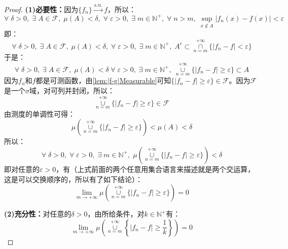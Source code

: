 \begin{proof}
	\textbf{(1)必要性：}因为$\{f_n\}\overset{\text{a.u.}}{\longrightarrow}f$，所以：
	\begin{equation*}
		\forall\;\delta>0,\;\exists\;A\in \mathscr{F},\;\mu(A)<\delta,\;\forall\;\varepsilon>0,\;\exists\;m\in \mathbb{N}^+,\;\forall\;n>m,\;\sup_{x\notin A}|f_n(x)-f(x)|<\varepsilon
	\end{equation*}
	即：
	\begin{equation*}
		\forall\;\delta>0,\;\exists\;A\in \mathscr{F},\;\mu(A)<\delta,\;\forall\;\varepsilon>0,\;\exists\;m\in\mathbb{N}^+,\;A^c\subset\underset{n=m}{\overset{+\infty}{\cap}}\{|f_n-f|<\varepsilon\}
	\end{equation*}
	于是：
	\begin{equation*}
		\forall\;\delta>0,\;\exists\;A\in \mathscr{F},\;\mu(A)<\delta\;\forall\;\varepsilon>0,\;\exists\;m\in\mathbb{N}^+,\;\underset{n=m}{\overset{+\infty}{\cup}}\{|f_n-f|\geqslant\varepsilon\}\subset A
	\end{equation*}
	因为$f_n$和$f$都是可测函数，由\cref{lem:|f-g|Measurable}可知$\{|f_n-f|\geqslant\varepsilon\}\in \mathscr{F}$。因为$\mathscr{F}$是一个$\sigma$域，对可列并封闭，所以：
	\begin{equation*}
		\underset{n=m}{\overset{+\infty}{\cup}}\{|f_n-f|\geqslant\varepsilon\}\in \mathscr{F}
	\end{equation*}
	由测度的单调性可得：
	\begin{equation*}
		\mu\left(\underset{n=m}{\overset{+\infty}{\cup}}\{|f_n-f|\geqslant\varepsilon\}\right)<\mu(A)<\delta
	\end{equation*}
	所以：
	\begin{equation*}
		\forall\;\delta>0,\;\forall\;\varepsilon>0,\;\exists\;m\in\mathbb{N}^+,\;\mu\left(\underset{n=m}{\overset{+\infty}{\cup}}\{|f_n-f|\geqslant\varepsilon\}\right)<\delta
	\end{equation*}
	即对任意的$\varepsilon>0$，有（上式前面的两个任意用集合语言来描述就是两个交运算，这是可以交换顺序的，所以有了如下结论）：
	\begin{equation*}
		\lim_{m\to+\infty}\mu\left(\underset{n=m}{\overset{+\infty}{\cup}}\{|f_n-f|\geqslant\varepsilon\}\right)=0
	\end{equation*}\par
	\textbf{(2)充分性：}对任意的$\delta>0$，由所给条件，对$k\in\mathbb{N}^+$有：
	\begin{equation*}
		\lim_{m\to+\infty}\mu\left(\underset{n=m}{\overset{+\infty}{\cup}}\left\{|f_n-f|\geqslant\frac{1}{k}\right\}\right)=0	

\end{equation*}
\end{proof}
